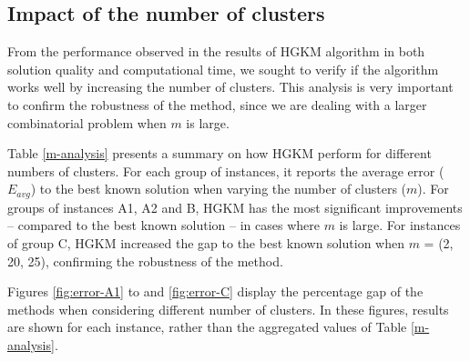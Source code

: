 \subsection{Impact of the number of clusters}

From the performance observed in the results of HGKM algorithm in both solution quality and computational time, we sought to verify if the algorithm works well by increasing the number of clusters. %
This analysis is very important to confirm the robustness of the method, since we are dealing with a larger combinatorial problem when $m$ is large.

Table \ref{m-analysis} presents a summary on how HGKM perform for different numbers of clusters.
For each group of instances, it reports the average error ($E_{avg}$) to the best known solution when varying the number of clusters ($m$). For groups of instances A1, A2 and B, HGKM has the most significant improvements -- compared to the best known solution -- in cases where $m$ is large. For instances of group C, HGKM increased the gap to the best known solution when $m$ = (2, 20, 25), confirming the robustness of the method.



Figures \ref{fig:error-A1} to and \ref{fig:error-C} display the percentage gap of the methods when considering different number of clusters. In these figures, results are shown for each instance, rather than the aggregated values of Table \ref{m-analysis}.

